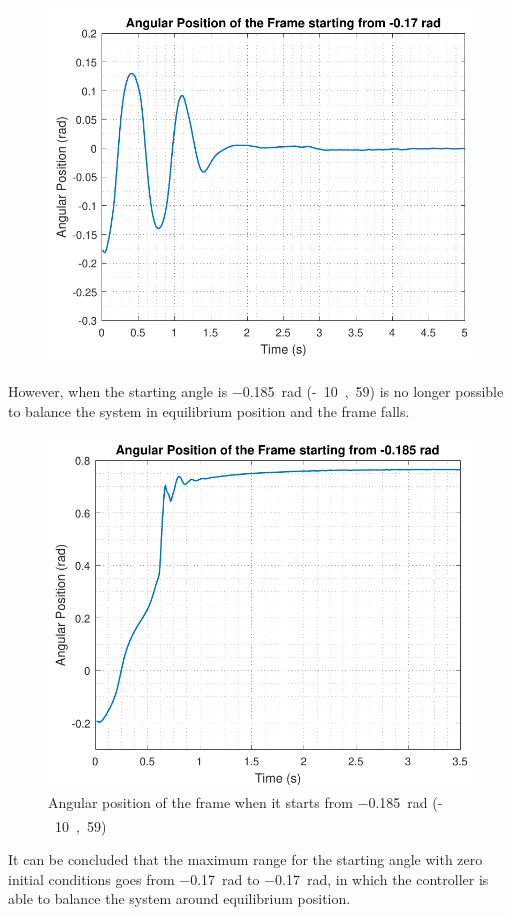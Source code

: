 \begin{minipage}{\linewidth}
\begin{minipage}{0.45\linewidth}
\begin{figure}[H]
			\includegraphics[scale=.55]{figures/testCatch_17}
			\centering
			\captionsetup{justification=centering}
			\label{testCatch_17}
		\end{figure}
	\end{minipage}
\end{minipage}

However, when the starting angle is \SI{-0,185}{rad} (\si{-10,59^\circ}) is no longer possible to balance the system in equilibrium position and the frame falls.

\begin{figure}[H] 
	\centering
	\includegraphics[scale=0.55]{figures/testCatch_185}
	\caption{Angular position of the frame when it starts from \SI{-0,185}{rad} (\si{-10,59^\circ})}
	\label{testCatch_185}
\end{figure}
%
It can be concluded that the maximum range for the starting angle with zero initial conditions goes from \SI{-0,17}{rad} to \SI{-0,17}{rad}, in which the controller is able to balance the system around equilibrium position.